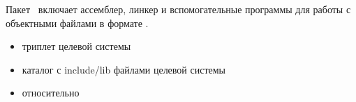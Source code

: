 {


Пакет \ включает ассемблер, линкер и вспомогательные программы
для работы с объектными файлами в формате . 

\begin{itemize}
  \item{} триплет целевой системы 
  \item{} каталог с include/lib файлами целевой системы
  \item{} относительно 
\end{itemize}



}{}
